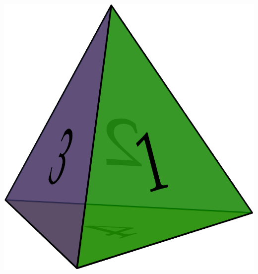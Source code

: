 \begin{examples}{}{}
\begin{enumerate}
\begin{minipage}[t]{0.3\linewidth}
	  	\flushright\href{https://www.math.uci.edu/~ndonalds/math120a/perm-a4.html}{\includegraphics[scale=0.14]{perm-a4.png}}
	  \end{minipage}
	
	\end{enumerate}
\end{examples}


